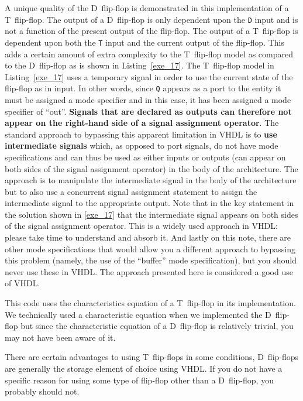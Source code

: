 \begin{my_list}
\item A unique quality of the D~flip-flop is demonstrated in this implementation of a T~flip-flop. The output of a D~flip-flop is only dependent upon the \texttt{D} input and is not a function of the present output of the flip-flop. The output of a T~flip-flop is dependent upon both the \texttt{T} input and the current output of the flip-flop. This adds a certain amount of extra complexity to the T~flip-flop model as compared to the D~flip-flop as is shown in Listing~\ref{exe_17}. The T~flip-flop model in Listing~\ref{exe_17} uses a temporary signal in order to use the current state of the flip-flop as in input. In other words, since \texttt{Q} appears as a port to the entity it must be assigned a mode specifier and in this case, it has been assigned a mode specifier of ``out''. \textbf{Signals that are declared as outputs can therefore not appear on the right-hand side of a signal assignment operator}. The standard approach to bypassing this apparent limitation in VHDL is to \textbf{use intermediate signals} which, as opposed to port signals, do not have mode specifications and can thus be used as either inputs or outputs (can appear on both sides of the signal assignment operator) in the body of the architecture. The approach is to manipulate the intermediate signal in the body of the architecture but to also use a concurrent signal assignment statement to assign the intermediate signal to the appropriate output. Note that in the key statement in the solution shown in \ref{exe_17} that the intermediate signal appears on both sides of the signal assignment operator. This is a widely used approach in VHDL: please take time to understand and absorb it. And lastly on this note, there are other mode specifications that would allow you a different approach to bypassing this problem (namely, the use of the ``buffer'' mode specification), but you should never use these in VHDL. The approach presented here is considered a good use of VHDL.

\item This code uses the characteristics equation of a T~flip-flop in its implementation. We technically used a characteristic equation when we implemented the D~flip-flop but since the characteristic equation of a D~flip-flop is relatively trivial, you may not have been aware of it.
\item There are certain advantages to using T~flip-flops in some conditions, D~flip-flops are generally the storage element of choice using VHDL. If you do not have a specific reason for using some type of flip-flop other than a D~flip-flop, you probably should not.
\end{my_list}

